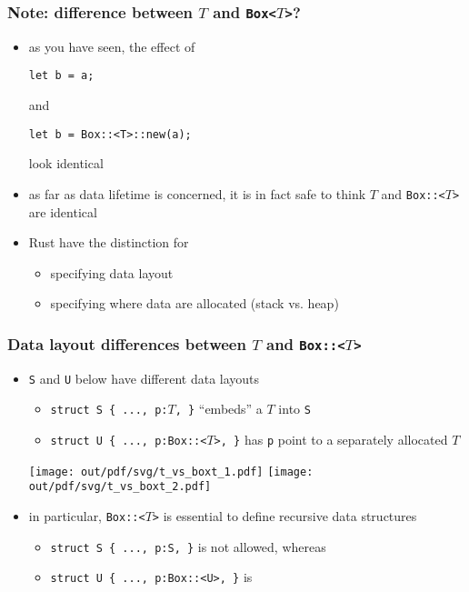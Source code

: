 \documentclass[12pt,dvipdfmx]{beamer}
\newcommand{\mura}[1]{{\color{purple}#1}}
\newcommand{\ao}[1]{{\color{blue}#1}}
\begin{document}
\begin{frame}[fragile]
  \frametitle{Note: difference between $T$ and {\tt Box<$T$>}?}
  \begin{itemize}
  \item as you have seen, the effect of
\begin{lstlisting}
let b = a;      
\end{lstlisting}
and
\begin{lstlisting}
let b = Box::<T>::new(a);
\end{lstlisting}
look identical
    
\item as far as data lifetime is concerned,
  it is in fact safe to think \mura{$T$} and \mura{\tt Box::<$T$>}
  are identical
  
\item Rust have the distinction for
  \begin{itemize}
  \item specifying data layout
  \item specifying where data are allocated (stack vs. heap)
  \end{itemize}
\end{itemize}
\end{frame}
    
\begin{frame}
  \frametitle{Data layout differences between $T$ and {\tt Box::<$T$>}}
  \begin{itemize}
  \item {\tt S} and {\tt U} below have different data layouts
    \begin{itemize}
    \item {\tt struct S \{ ..., p:\ao{$T$}, \}} ``embeds'' a $T$ into {\tt S}
    \item {\tt struct U \{ ..., p:\mura{Box::<$T$>}, \}}
      has {\tt p} point to a separately allocated $T$
    \end{itemize}

    \begin{center}
      \texttt{[image: out/pdf/svg/t\_vs\_boxt\_1.pdf]}
      \hspace{1cm}
      \texttt{[image: out/pdf/svg/t\_vs\_boxt\_2.pdf]}
    \end{center}
    
  \item in particular, {\tt Box::<$T$>} is essential to define recursive data structures
    \begin{itemize}
    \item {\tt struct S \{ ..., p:\ao{S}, \}} is not allowed, whereas
    \item {\tt struct U \{ ..., p:\mura{Box::<U>}, \}} is
    \end{itemize}
  \end{itemize}
\end{frame}
\end{document}
